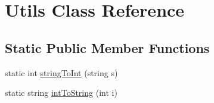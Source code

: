 \hypertarget{class_utils}{\section{\-Utils \-Class \-Reference}
\label{class_utils}
}
\subsection*{\-Static \-Public \-Member \-Functions}
\begin{DoxyCompactItemize}
\item 
static int \hyperlink{class_utils_aadddf97055262d0f250503deb8348e69}{string\-To\-Int} (string s)
\item 
static string \hyperlink{class_utils_a12fe6e7e6d451ff26388b99a85b21ed0}{int\-To\-String} (int i)
\end{DoxyCompactItemize}


